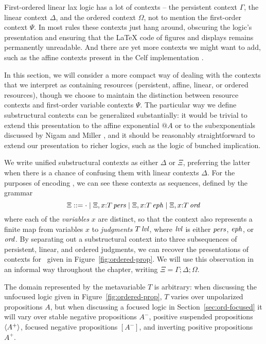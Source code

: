 First-ordered linear lax logic has a lot of contexts -- the persistent
context $\Gamma$, the linear context $\Delta$, and the ordered context
$\Omega$, not to mention the first-order context $\Psi$. In most rules
these contexts just hang around, obscuring the logic's presentation
and ensuring that the {\LaTeX} code of figures and displays remains
permanently unreadable. And there are yet more contexts we might want to 
add, such as the affine contexts present in the Celf implementation
\cite{schacknielsen08celf}.

In this section, we will consider a more compact way of dealing with
the contexts that we interpret as containing resources (persistent,
affine, linear, or ordered resources), though we choose to maintain
the distinction between resource contexts and first-order variable
contexts $\Psi$.  The particular way we define substructural contexts
can be generalized substantially: it would be trivial to extend this
presentation to the affine exponential ${@}A$ or to the subexponentials
discussed by Nigam and Miller \cite{nigam09algorithmic}, and it should
be reasonably straightforward to extend our presentation to richer
logics, such as the logic of bunched implication.

We write unified substructural contexts as either $\Delta$ or $\Xi$,
preferring the latter when there is a chance of confusing them with
linear contexts $\Delta$. For the purposes of encoding \ollll, we can
see these contexts as sequences, defined by the grammar
\[
\Xi ::= \cdot 
  \mid \Xi, x{:}{T}\,{{\it pers}}
  \mid \Xi, x{:}{T}\,{{\it eph}}
  \mid \Xi, x{:}{T}\,{{\it ord}}
\]
where each of the {\em variables} $x$ are distinct, so that the
context also represents a finite map from variables $x$ to {\it
  judgments} ${T}\,{{\it lvl}}$, where ${\it lvl}$ is either ${\it pers}$, ${\it eph}$,
or ${\it ord}$.  By separating out a substructural context into three
subsequences of persistent, linear, and ordered judgments, we can
recover the presentations of contexts for \ollll~given in
Figure~\ref{fig:ordered-prop}. We will use this observation in an
informal way throughout the chapter, writing $\Xi = \Gamma; \Delta;
\Omega$.

The domain represented by the metavariable $T$ is arbitrary: when
discussing the unfocused logic given in Figure~\ref{fig:ordered-prop},
$T$ varies over unpolarized propositions $A$, but when discussing a
focused logic in Section~\ref{sec:ord-focused} it will vary over
stable negative propositions $A^-$, positive suspended propositions
$\langle {A^+} \rangle$, focused negative propositions $[A^-]$, and inverting
positive propositions $A^+$.



